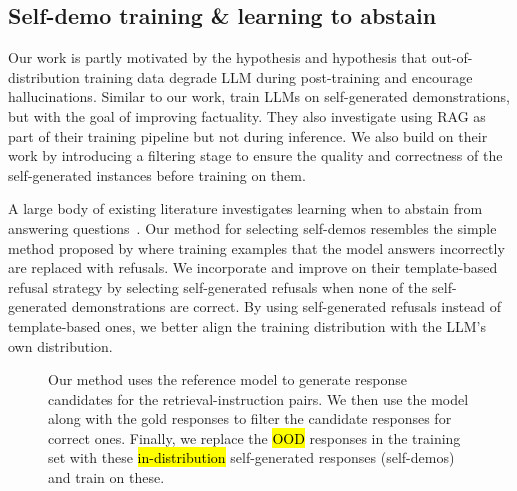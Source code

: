 \subsection{Self-demo training \& learning to abstain}
Our work is partly motivated by the hypothesis \citet{Lin2024FLAMEFA} and  hypothesis that out-of-distribution training data degrade LLM during post-training and encourage hallucinations.
Similar to our work, \citet{Lin2024FLAMEFA} train LLMs on self-generated demonstrations, but with the goal of improving factuality.
They also investigate using RAG as part of their training pipeline but not during inference.
We also build on their work by introducing a filtering stage to ensure the quality and correctness of the self-generated instances before training on them. 

A large body of existing literature investigates learning when to abstain from answering questions~\citep{wen2024know}.
Our method for selecting self-demos resembles the simple method proposed by \citet{yang2023alignment}
where training examples that the model answers incorrectly are replaced with refusals. 
We incorporate and improve on their template-based refusal strategy by selecting self-generated refusals when none of the self-generated demonstrations are correct.
By using self-generated refusals instead of template-based ones, we better align the training distribution with the LLM's own distribution.

\begin{figure*}
  \centering
  \small
  
  \caption[Our method]{
    Our method uses the reference model to generate response candidates for the retrieval-instruction pairs.
    We then use the model along with the gold responses to filter the candidate responses for correct ones.
    Finally, we replace the \hl{OOD} responses in the training set 
    with these \hl{in-distribution} self-generated responses (self-demos) and train on these. 
  }
  \label{fig:method}
\end{figure*}
